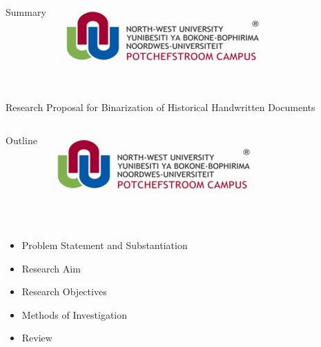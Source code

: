 \documentclass[11pt]{beamer}
\begin{document}
	\begin{frame}[t]
		\begin{columns}[onlytextwidth]
				\begin{Large}
					\vspace{-0.2cm}
					\color{beamer@maroon}Summary
				\end{Large}
			\column{0.25\textwidth}
				\includegraphics[scale=0.4]{nwulogo.jpeg}
		\end{columns}
		\hspace{6.5cm}
		\newline
		\noindent\makebox[\linewidth]{\rule{\paperwidth}{0.4pt}}\\
		[2cm]
		Research Proposal for Binarization of Historical Handwritten Documents
	\end{frame}
	
	
	\begin{frame}[t]
		\begin{columns}[onlytextwidth]
			\column{0.75\textwidth}
				\begin{Large}
					\vspace{-0.2cm}
					\color{beamer@maroon}Outline
				\end{Large}
				\includegraphics[scale=0.4]{nwulogo.jpeg}
		\end{columns}
		\hspace{6.5cm}
		\newline
		\noindent\makebox[\linewidth]{\rule{\paperwidth}{0.4pt}}\\
		[1cm]
		\begin{itemize}
			\item Problem Statement and Substantiation %
			\item Research Aim %
			\item Research Objectives %
			\item Methods of Investigation %
			\item Review
		\end{itemize}
	\end{frame}
	
\end{document}
